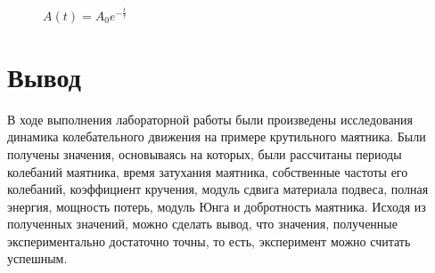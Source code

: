 \documentclass[a4paper,12pt]{report}
\begin{document}
\begin{figure}[h]%
	\centering
	\caption{$A(t) = A_0e^{-\frac{t}{\tau}}$}
	\label{framework2} %
\end{figure}

\newpage
\newpage

\section*{Вывод}

В ходе выполнения лабораторной работы были произведены исследования динамика колебательного движения на примере крутильного маятника. 
Были получены значения, основываясь на которых, были рассчитаны периоды колебаний маятника, 
время затухания маятника, собственные частоты его колебаний, коэффициент кручения, 
модуль сдвига материала подвеса, полная энергия, мощность потерь, модуль Юнга и добротность маятника. 
Исходя из полученных значений, можно сделать вывод, что значения, полученные экспериментально достаточно точны, то есть, эксперимент можно считать успешным.


\newpage
\end{document}
